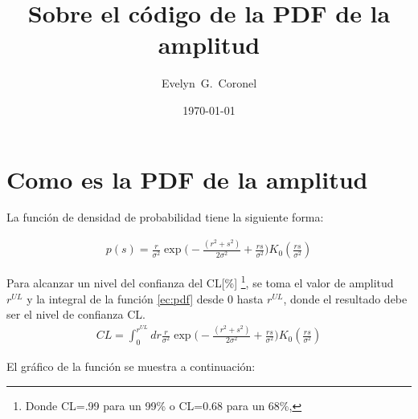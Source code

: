 



\title{Sobre el código de la PDF de la amplitud}
\author{Evelyn~G.~Coronel}


\date[]{\lowercase{\today}} %


\maketitle


\section{Como  es la PDF de la amplitud}

La función de densidad de probabilidad tiene la siguiente forma:

\begin{align}
    p(s) =\frac{r}{\sigma^2}\exp{\Big( -\frac{(r^2+s^2)}{2\sigma^2} + \frac{rs}{\sigma^2}\Big)}K_0(\frac{rs}{\sigma^2})    \label{ec:pdf}
\end{align}    

Para alcanzar un  nivel del confianza  del  CL[\%] \footnote{ Donde CL=.99 para un 99\% o CL=0.68 para un 68\%,},  se toma el valor de amplitud $r^{UL}$ y la integral de la función \ref{ec:pdf} desde 0 hasta $r^{UL}$, donde el resultado debe ser el nivel de confianza CL.
\begin{align}
    CL = \int_{0}^{r^{UL}} dr \frac{r}{\sigma^2}\exp{\Big( -\frac{(r^2+s^2)}{2\sigma^2} + \frac{rs}{\sigma^2}\Big)}K_0(\frac{rs}{\sigma^2})
    \label{ec:integral}
\end{align}

El gráfico de la función se muestra a continuación:

